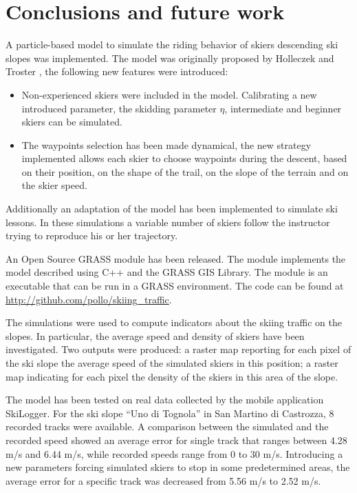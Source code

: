 \documentclass[12pt,a4paper,twoside]{book}
\begin{document}
\chapter{Conclusions and future work}\label{conclusions}
A particle-based model to simulate the riding behavior of skiers descending ski slopes was implemented. The model was originally proposed by Holleczek and Troster \cite{hol2012}, the following new features were introduced:
\begin{itemize}
\item Non-experienced skiers were included in the model. Calibrating a new introduced parameter, the skidding parameter $\eta$, intermediate and beginner skiers can be simulated.
\item The waypoints selection has been made dynamical, the new strategy implemented allows each skier to choose waypoints during the descent, based on their position, on the shape of the trail, on the slope of the terrain and on the skier speed.
\end{itemize}
Additionally an adaptation of the model has been implemented to simulate ski lessons. In these simulations a variable number of skiers follow the instructor trying to reproduce his or her trajectory.

An Open Source GRASS module has been released. The module implements the model described using C++ and the GRASS GIS Library. The module is an executable that can be run in a GRASS environment. The code can be found at \url{http://github.com/pollo/skiing_traffic}.

The simulations were used to compute indicators about the skiing traffic on the slopes. In particular, the average speed and density of skiers have been investigated. Two outputs were produced: a raster map reporting for each pixel of the ski slope the average speed of the simulated skiers in this position; a raster map indicating for each pixel the density of the skiers in this area of the slope.

The model has been tested on real data collected by the mobile application SkiLogger. For the ski slope ``Uno di Tognola'' in San Martino di Castrozza, 8 recorded tracks were available. A comparison between the simulated and the recorded speed showed an average error for single track that ranges between 4.28 m/s and 6.44 m/s, while recorded speeds range from 0 to 30 m/s. Introducing a new parameters forcing simulated skiers to stop in some predetermined areas, the average error for a specific track was decreased from 5.56 m/s to 2.52 m/s.
\end{document}
